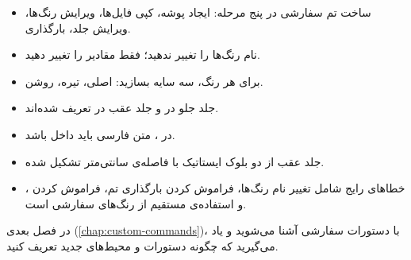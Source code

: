 \begin{itemize}
    \item ساخت تم سفارشی در پنج مرحله:
    ایجاد پوشه، کپی فایل‌ها، ویرایش رنگ‌ها،
    ویرایش جلد، بارگذاری.

    \item نام رنگ‌ها را تغییر ندهید؛ فقط
    مقادیر  را تغییر دهید.

    \item برای هر رنگ، سه سایه بسازید: اصلی،
    تیره، روشن.

    \item جلد جلو در  و جلد
    عقب در  تعریف شده‌اند.

    \item در ، متن فارسی باید
    داخل  باشد.

    \item جلد عقب از دو بلوک ایستاتیک با
    فاصله‌ی  سانتی‌متر تشکیل شده.

    \item خطاهای رایج شامل تغییر نام رنگ‌ها،
    فراموش کردن بارگذاری تم، فراموش کردن
    ، و استفاده‌ی
    مستقیم از رنگ‌های سفارشی است.
\end{itemize}

در فصل بعدی (\cref{chap:custom-commands})،
با دستورات سفارشی آشنا می‌شوید و یاد
می‌گیرید که چگونه دستورات و محیط‌های جدید
تعریف کنید.